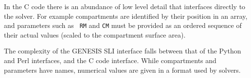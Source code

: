 \documentclass[12pt]{article}
\begin{document}
In the C code there is an abundance of low level detail that
interfaces directly to the solver.  For example compartments are
identified by their position in an array, and parameters such as {\tt
  RM} and {\tt CM} must be provided as an ordered sequence of their
actual values (scaled to the compartment surface area).

The complexity of the GENESIS SLI interface falls between that of the
Python and Perl interfaces, and the C code interface.  While
compartments and parameters have names, numerical values are given in
a format used by solvers.

    










\end{document}
